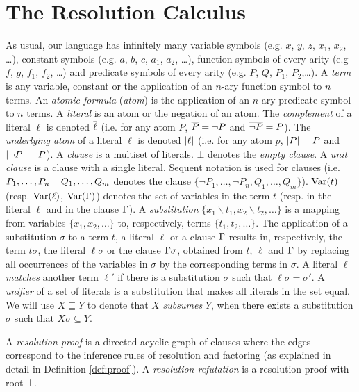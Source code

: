 \section{The Resolution Calculus}
\label{sec:res}

As usual, our language has infinitely many variable symbols (e.g. $x$, $y$, $z$, $x_1$, $x_2$, \ldots), constant symbols (e.g. $a$, $b$, $c$, $a_1$, $a_2$, \ldots), function symbols of every arity (e.g $f$, $g$, $f_1$, $f_2$, \ldots) and predicate symbols of every arity (e.g. $P$, $Q$, $P_1$, $P_2$,\ldots). A \emph{term} is any variable, constant or the application of an $n$-ary function symbol to $n$ terms.
An \emph{atomic formula} (\emph{atom}) is the application of an $n$-ary predicate symbol to $n$ terms. A \emph{literal} is an atom or the negation of an atom. The
\emph{complement} of a literal $\ell$ is denoted $\overline{\ell}$ (i.e. for any atom $P$,
$\overline{P} = \neg P$ and $\overline{\neg P} = P$). The \emph{underlying atom} of a literal $\ell$ is denoted $\lvert\ell\rvert$ (i.e. for any atom $p$, $\lvert P\rvert = P$ and $\lvert\neg P\rvert = P$). A
\emph{clause} is a multiset of literals. $\bot$ denotes the \emph{empty clause}. A \emph{unit clause} is a clause with a single literal. Sequent notation is used for clauses (i.e. $P_1,\ldots,P_n \vdash Q_1,\ldots, Q_m$ denotes the clause $\{ \neg P_1,\ldots, \neg P_n, Q_1, \ldots, Q_m \}$).
$\mathrm{Var}(t)$ (resp. $\mathrm{Var}(\ell)$, $\mathrm{Var}(\Gamma)$) denotes the set of variables in the term $t$ (resp. in the literal $\ell$ and in the clause $\Gamma$).
A \emph{substitution} $\{ x_1\backslash t_1, x_2 \backslash t_2, \ldots \}$ is a mapping from variables $\{ x_1, x_2, \ldots \}$ to, respectively, terms $\{t_1, t_2, \ldots \}$. The application of a substitution $\sigma$ to a term $t$, a literal $\ell$ or a clause $\Gamma$ results in, respectively, the term $t \sigma$, the literal $\ell \sigma$ or the clause $\Gamma \sigma$, obtained from $t$, $\ell$ and $\Gamma$ by replacing all occurrences of the variables in $\sigma$ by the corresponding terms in $\sigma$. A literal $\ell$ \emph{matches} another term $\ell'$ if there is a substitution $\sigma$ such that $\ell\sigma=\sigma'$. A \emph{unifier} of a set of literals is a substitution that makes all literals in the set equal. We will use $X \sqsubseteq Y$ to denote that $X$ \emph{subsumes} $Y$, when there exists a substitution $\sigma$ such that $X\sigma \subseteq Y$.


A \emph{resolution proof} is a directed acyclic graph of clauses where the edges correspond to the inference rules of resolution and factoring (as explained in detail in Definition \ref{def:proof}). A \emph{resolution refutation} is a resolution proof with root $\bot$.


